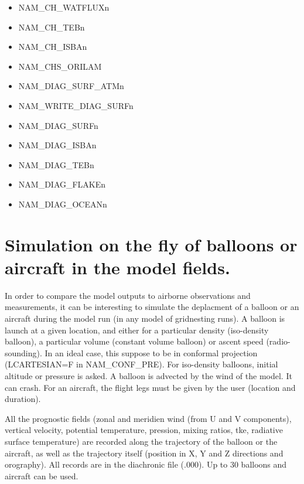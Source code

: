 \begin{itemize}
\item NAM\_CH\_WATFLUXn
\item NAM\_CH\_TEBn
\item NAM\_CH\_ISBAn
\item NAM\_CHS\_ORILAM
\item NAM\_DIAG\_SURF\_ATMn
\item NAM\_WRITE\_DIAG\_SURFn
\item NAM\_DIAG\_SURFn
\item NAM\_DIAG\_ISBAn
\item NAM\_DIAG\_TEBn
\item NAM\_DIAG\_FLAKEn
\item NAM\_DIAG\_OCEANn
\end{itemize}






\section{Simulation on the fly of balloons or aircraft in the model fields.}
\label{ss:balloon}

In order to compare the model outputs to airborne observations
and measurements, it can be interesting to simulate the deplacment of a
balloon or an aircraft during the model run (in any model of
gridnesting runs). A balloon is launch at
a given location, and either for a particular density (iso-density balloon),
a particular volume (constant volume balloon)
or ascent speed (radio-sounding). In an ideal case, this suppose to be in conformal projection 
(LCARTESIAN=F in NAM\_CONF\_PRE).
For iso-density balloons, initial 
altitude or pressure is asked. A balloon is advected by the wind of the
model. It can crash. For an aircraft, the flight
legs must be given by the user (location and duration). 

All the prognostic fields (zonal and meridien wind
(from U and V components), vertical velocity, potential temperature, pression,
mixing ratios, tke, radiative surface temperature)
are recorded along the trajectory
of the balloon or the aircraft, as well as the trajectory itself (position in
X, Y and Z directions and orography).
All records are in the diachronic file (.000). Up to 30 balloons and aircraft
can be used.

